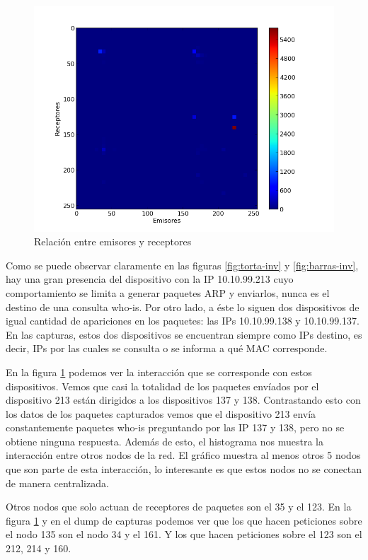\begin{figure}[!h]
  \includegraphics[width=\textwidth,keepaspectratio]{graph/hist2d-invgate.png}
  \caption{Relación entre emisores y receptores}
  \label{fig:hist2d-inv}
\end{figure}

Como se puede observar claramente en las figuras \ref{fig:torta-inv} y 
\ref{fig:barras-inv}, hay una gran presencia del dispositivo con la IP 10.10.99.213 cuyo comportamiento se limita a generar paquetes ARP y enviarlos, nunca es el destino de una consulta who-is. Por otro lado, a éste lo siguen dos dispositivos de igual cantidad de apariciones en los paquetes: las IPs 10.10.99.138 y 10.10.99.137. En las capturas, estos dos dispositivos se encuentran siempre como IPs destino, es decir, IPs por las cuales se consulta o se informa a qué MAC corresponde.
 
En la figura \ref{fig:hist2d-inv} podemos ver la interacción que se corresponde con estos dispositivos. Vemos que casi la totalidad de los paquetes envíados por el dispositivo 213 están dirigidos a los dispositivos 137 y 138. Contrastando esto con los datos de los paquetes capturados vemos que el dispositivo 213 envía constantemente paquetes who-is preguntando por las IP 137 y 138, pero no se obtiene ninguna respuesta.
Además de esto, el histograma nos muestra la interacción entre otros nodos de la red. El gráfico muestra al menos otros 5 nodos que son parte de esta interacción, lo interesante es que estos nodos no se conectan de manera centralizada.

Otros nodos que solo actuan de receptores de paquetes son el 35 y el 123. En la figura \ref{fig:hist2d-inv} y en el dump de capturas podemos ver que los que hacen peticiones sobre el nodo 135 son el nodo 34 y el 161. Y los que hacen peticiones sobre el 123 son el 212, 214 y 160.

